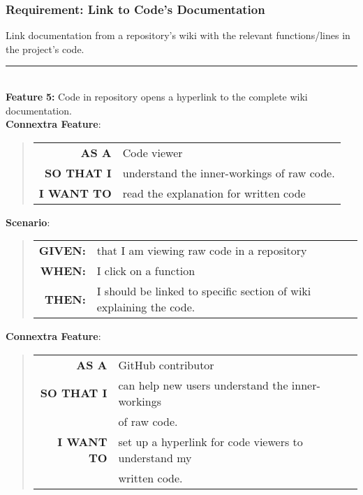 \documentclass[12pt]{article}
\newcommand{\Feature}[1]{ 
   \noindent \textbf{Feature} #1
}
\newcommand{\GivenSc} {
	\noindent \textbf{GIVEN:}
	}
\newcommand{\WhenSc} {
	\noindent \textbf{WHEN:}
	}
\newcommand{\ThenSc} {
	\noindent \textbf{THEN:}
	}
\begin{document}
\pagebreak
\begin{framed}
\subsubsection{Requirement: Link to Code's Documentation}
Link documentation from a repository's wiki with the relevant functions/lines in the project's code.\\[0.2cm]

\hrule~\\

\noindent \Feature{\textbf{5:} Code in repository opens a hyperlink to the complete wiki documentation.}\\[0.2cm]

\noindent \textbf{Connextra Feature}:
\begin{quote}
\begin{tabular}{rl}
\textbf{AS A}      & Code viewer\\
\textbf{SO THAT I} & understand the inner-workings of raw code.\\
\textbf{I WANT TO} & read the explanation for written code
\end{tabular}
\end{quote}


\noindent \textbf{Scenario}:
\begin{quote}
\begin{tabular}{rl}
\GivenSc & that I am viewing raw code in a repository\\
\WhenSc & I click on a function\\
\ThenSc & I should be linked to specific section of wiki explaining the code. 
\end{tabular}
\end{quote}


\noindent \textbf{Connextra Feature}:
\begin{quote}
\begin{tabular}{rl}
\textbf{AS A}      & \textsf{GitHub} contributor\\
\textbf{SO THAT I} & can help new users understand the inner-workings \\
                   & of raw code.\\
\textbf{I WANT TO} & set up a hyperlink for code viewers to understand my\\
                   &  written code.
\end{tabular}
\end{quote}


\end{framed}
\end{document}
